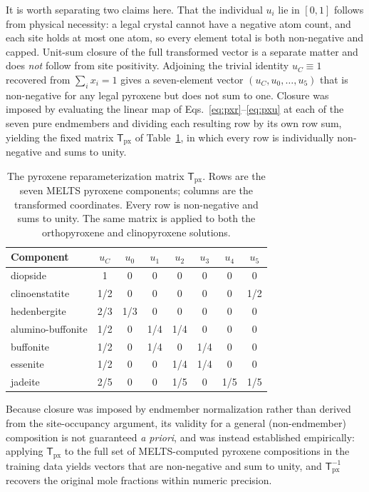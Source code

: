 It is worth separating two claims here. That the individual $u_i$ lie in $[0,1]$
follows from physical necessity: a legal crystal cannot have a negative atom count,
and each site holds at most one atom, so every element total is both non-negative
and capped. Unit-sum closure of the full transformed vector is a separate matter and
does \emph{not} follow from site positivity. Adjoining the trivial identity
$u_C\equiv1$ recovered from $\sum_i x_i=1$ gives a seven-element vector
$(u_C,u_0,\dots,u_5)$ that is non-negative for any legal pyroxene but does not sum to
one. Closure was imposed by evaluating the linear map of
Eqs.~\eqref{eq:pxr}--\eqref{eq:pxu} at each of the seven pure endmembers and dividing
each resulting row by its own row sum, yielding the fixed matrix
$\mathsf{T}_{\mathrm{px}}$ of Table~\ref{tab:pxmatrix}, in which every row is
individually non-negative and sums to unity.

\begin{table}[t]
\centering
\caption{The pyroxene reparameterization matrix $\mathsf{T}_{\mathrm{px}}$. Rows are
the seven \textsc{MELTS} pyroxene components; columns are the transformed
coordinates. Every row is non-negative and sums to unity. The same matrix is applied
to both the orthopyroxene and clinopyroxene solutions.}
\label{tab:pxmatrix}
\begin{tabular}{lccccccc}
\toprule
Component & $u_C$ & $u_0$ & $u_1$ & $u_2$ & $u_3$ & $u_4$ & $u_5$ \\
\midrule
diopside          & 1   & 0   & 0   & 0   & 0   & 0   & 0 \\
clinoenstatite    & 1/2 & 0   & 0   & 0   & 0   & 0   & 1/2 \\
hedenbergite      & 2/3 & 1/3 & 0   & 0   & 0   & 0   & 0 \\
alumino-buffonite & 1/2 & 0   & 1/4 & 1/4 & 0   & 0   & 0 \\
buffonite         & 1/2 & 0   & 1/4 & 0   & 1/4 & 0   & 0 \\
essenite          & 1/2 & 0   & 0   & 1/4 & 1/4 & 0   & 0 \\
jadeite           & 2/5 & 0   & 0   & 1/5 & 0   & 1/5 & 1/5 \\
\bottomrule
\end{tabular}
\end{table}

Because closure was imposed by endmember normalization rather than derived from the
site-occupancy argument, its validity for a general (non-endmember) composition is
not guaranteed \emph{a priori}, and was instead established empirically: applying
$\mathsf{T}_{\mathrm{px}}$ to the full set of \textsc{MELTS}-computed pyroxene
compositions in the training data yields vectors that are non-negative and sum to
unity, and $\mathsf{T}_{\mathrm{px}}^{-1}$ recovers the original mole fractions 
within numeric precision.

